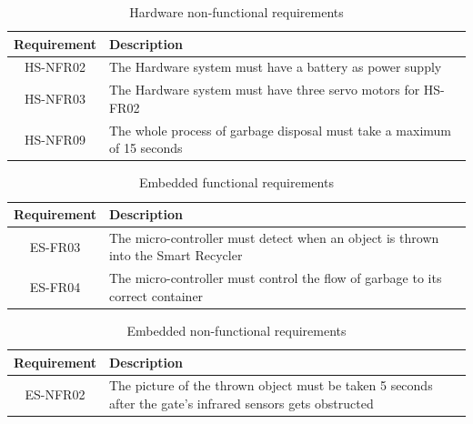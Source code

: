 \documentclass[a4paper,11pt]{article}
\begin{document}
\begin{table}[H]
  \caption{\small{Hardware non-functional requirements}}
  \begin{center}
    \begin{tabular}{|c|p{95mm}|}
      \hline
      Requirement & Description                                                             \\ \hline
      HS-NFR02    & The Hardware system must have a battery as power supply                 \\ \hline
      HS-NFR03    & The Hardware system must have three servo motors for HS-FR02            \\ \hline
      HS-NFR09    & The whole process of garbage disposal must take a maximum of 15 seconds \\ \hline
    \end{tabular}
  \end{center}
  \label{tab:hardware1}
\end{table}

\begin{table}[H]
  \small
  \caption{\small{Embedded functional requirements}}
  \begin{center}
    \begin{tabular}{|c|p{95mm}|}
      \hline
      Requirement & Description                                                                       \\ \hline
      ES-FR03     & The micro-controller must detect when an object is thrown into the Smart Recycler \\ \hline
      ES-FR04     & The micro-controller must control the flow of garbage to its correct container    \\ \hline
    \end{tabular}
  \end{center}
  \label{tab:embedded0}
\end{table}

\begin{table}[H]
  \small
  \caption{\small{Embedded non-functional requirements}}
  \begin{center}
    \begin{tabular}{|c|p{95mm}|}
      \hline
      Requirement & Description                                                                                                \\ \hline

      ES-NFR02    & The picture of the thrown object must be taken 5 seconds after the gate’s infrared sensors gets obstructed \\ \hline
    \end{tabular}
  \end{center}
  \label{tab:embedded1}
\end{table}
\end{document}
